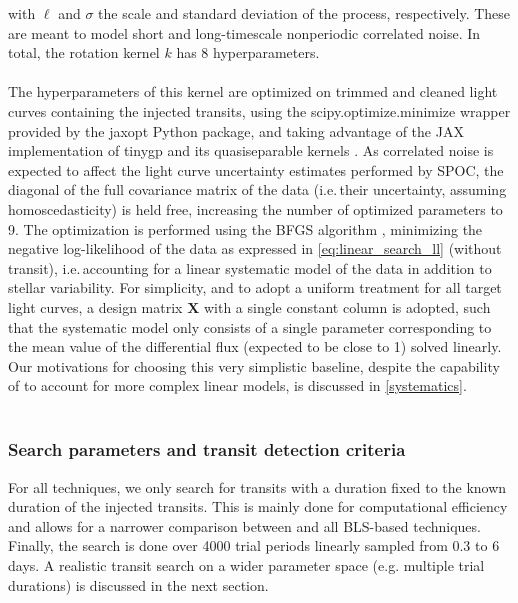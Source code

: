 \documentclass[modern]{aastex631}
\begin{document}
with $\ell$ and $\sigma$ the scale and standard deviation of the process, respectively. These are meant to model short and long-timescale nonperiodic correlated noise. In total, the rotation kernel $k$ has 8 hyperparameters.\\\\
The hyperparameters of this kernel are optimized on trimmed and cleaned light curves containing the injected transits, using the \textsf{scipy.optimize.minimize} wrapper provided by the \textsf{jaxopt} Python package, and taking advantage of the \textsf{JAX} implementation of \textsf{tinygp} and its quasiseparable kernels \citep{celerite}. As correlated noise is expected to affect the light curve uncertainty estimates performed by SPOC, the diagonal of the full covariance matrix of the data (i.e.\,their uncertainty, assuming homoscedasticity) is held free, increasing the number of optimized parameters to 9. The optimization is performed using the \textsf{BFGS} algorithm \citep{Fletcher1987}, minimizing the negative log-likelihood of the data as expressed in \autoref{eq:linear_search_ll} (without transit), i.e.\,accounting for a linear systematic model of the data in addition to stellar variability. For simplicity, and to adopt a uniform treatment for all target light curves, a design matrix $\bm{X}$ with a single constant column is adopted, such that the systematic model only consists of a single parameter corresponding to the mean value of the differential flux (expected to be close to 1) solved linearly. Our motivations for choosing this very simplistic baseline, despite the capability of \nuancemethod{} to account for more complex linear models, is discussed in \autoref{systematics}.\\\\
\subsubsection*{Search parameters and transit detection criteria}
For all techniques, we only search for transits with a duration fixed to the known duration of the injected transits. This is mainly done for computational efficiency and allows for a narrower comparison between \nuancemethod{} and all BLS-based techniques. Finally, the search is done over 4000 trial periods linearly sampled from 0.3 to 6 days. A realistic transit search on a wider parameter space (e.g. multiple trial durations) is discussed in the next section.
\newpage
\end{document}
